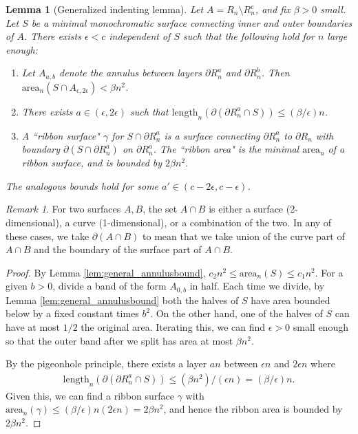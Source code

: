 \documentclass[11pt]{article}
\newtheorem{lemma}[thm]{Lemma}
\theoremstyle{remark}
\newtheorem{rem}[thm]{Remark}
\theoremstyle{definition}
\begin{document}
\begin{lemma}[Generalized indenting lemma]\label{lem:generalized_indenting}
Let $A = R_n \setminus R_{n}^c$, and fix $\beta>0$ small. Let $S$ be a minimal monochromatic surface connecting inner and outer boundaries of $A$. There exists $\epsilon<c$ independent of $S$ such that the following hold for $n$ large enough:
    \begin{enumerate}
        \item Let $A_{a,b}$ denote the annulus between layers $\partial R_n^a$ and $\partial R_n^b$. Then $\text{area}_n(S\cap A_{\epsilon,2\epsilon}) < \beta n^2$. 
        \item There exists $a\in (\epsilon, 2\epsilon)$ such that $\text{length}_n(\partial(\partial R_n^a \cap S)) \leq (\beta/\epsilon) n$. 
    \item A ``ribbon surface" $\gamma$ for $S\cap \partial R_n^a$ is a surface connecting $\partial R_n^a$ to $\partial R_n$ with boundary $\partial (S\cap \partial R_n^a)$ on $\partial R_n^a$. The ``{ribbon area}" is the minimal $\text{area}_n$ of a ribbon surface, and is bounded by $2\beta n^2$. 
    \end{enumerate}
    The analogous bounds hold for some $a'\in (c-2\epsilon, c -\epsilon)$.
\end{lemma}
\begin{rem}
    For two surfaces $A,B$, the set $A\cap B$ is either a surface (2-dimensional), a curve (1-dimensional), or a combination of the two. In any of these cases, we take $\partial (A\cap B)$ to mean that we take union of the curve part of $A\cap B$ and the boundary of the surface part of $A\cap B$. 
\end{rem}
\begin{proof}

By Lemma \ref{lem:general_annulusbound}, $c_2 n^2 \leq \text{area}_n(S)\leq c_1 n^2$. For a given $b>0$, divide a band of the form $A_{0,b}$ in half. Each time we divide, by Lemma \ref{lem:general_annulusbound} both the halves of $S$ have area bounded below by a fixed constant times $b^2$. On the other hand, one of the halves of $S$ can have at most $1/2$ the original area. Iterating this, we can find $\epsilon>0$ small enough so that the outer band after we split has area at most $\beta n^2$.

By the pigeonhole principle, there exists a layer $an$ between $\epsilon n$ and $2\epsilon n$ where 
\begin{align*}
    \text{length}_n(\partial(\partial R_n^a \cap S)) \leq (\beta n^2)/(\epsilon n)=(\beta/\epsilon) n.
\end{align*}
Given this, we can find a ribbon surface $\gamma$  with $\text{area}_n(\gamma)\leq (\beta/\epsilon)n (2\epsilon n) = 2\beta n^2$, and hence the ribbon area is bounded by $2 \beta n^2$. 
\end{proof}
\end{document}
